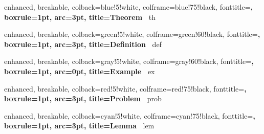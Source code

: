 
%
{
    enhanced, breakable,
    colback=blue!5!white,
    colframe=blue!75!black,
    fonttitle=\bfseries,
    boxrule=1pt,
    arc=3pt,
    title=Theorem~\thetcbcounter
}{th}

%
{
    enhanced, breakable,
    colback=green!5!white,
    colframe=green!60!black,
    fonttitle=\bfseries,
    boxrule=1pt,
    arc=3pt,
    title=Definition~\thetcbcounter
}{def}

%
{
    enhanced, breakable,
    colback=gray!5!white,
    colframe=gray!60!black,
    fonttitle=\bfseries,
    boxrule=1pt,
    arc=0pt, %
    title=Example~\thetcbcounter
}{ex}

%
{
    enhanced, breakable,
    colback=red!5!white,
    colframe=red!75!black,
    fonttitle=\bfseries\sffamily,
    boxrule=1pt,
    arc=3pt,
    title=Problem~\thetcbcounter
}{prob}

%
{
    enhanced, breakable,
    colback=cyan!5!white,
    colframe=cyan!75!black,
    fonttitle=\bfseries,
    boxrule=1pt,
    arc=3pt,
    title=Lemma~\thetcbcounter
}{lem}


\newenvironment{objective}
  {\small\begin{quote}\textbf{Objective:}\newline}
  {\end{quote}}